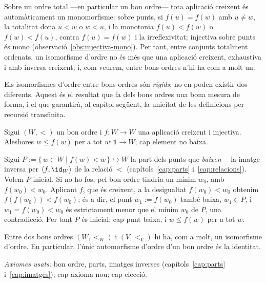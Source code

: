\begin{observacio}\label{obs:creixent-injectiva}
Sobre un ordre total ---en particular un bon ordre--- tota aplicació
creixent és automàticament un monomorfisme: sobre punts, si \(f(u)=f(w)\)
amb \(u\neq w\), la totalitat dona \(u<w\) o \(w<u\), i la monotonia
\(f(u)<f(w)\) o \(f(w)<f(u)\), contra \(f(u)=f(w)\) i la irreflexivitat;
injectiva sobre punts és mono (observació~\ref{obs:injectiva-mono}). Per tant, entre
conjunts totalment ordenats, un isomorfisme d'ordre no és més que una
aplicació creixent, exhaustiva i amb inversa creixent; i, com veurem, entre
bons ordres n'hi ha com a molt un.
\end{observacio}

Els isomorfismes d'ordre entre bons ordres són \emph{rígids}: no en poden
existir dos diferents. Aquest és el resultat que fa dels bons ordres una
bona mesura de forma, i el que garantirà, al capítol següent, la unicitat de
les definicions per recursió transfinita.

\begin{lema}\label{lema:rigidesa}
Sigui \((W,<)\) un bon ordre i \(f\colon W\to W\) una aplicació creixent i
injectiva. Aleshores \(w\le f(w)\) per a tot \(w\colon\mathbf1\to W\); cap
element no baixa.
\end{lema}

\begin{prova}
Sigui \(P:=\{\,w\in W\mid f(w)<w\,\}\hookrightarrow W\) la part dels punts
que \emph{baixen} ---la imatge inversa per \(\langle f,\id_W\rangle\) de la
relació \({<}\) (capítols~\ref{cap:parts} i~\ref{cap:relacions}). Volem
\(P\) inicial. Si no ho fos, pel bon ordre tindria un mínim \(w_0\), amb
\(f(w_0)<w_0\). Aplicant \(f\), que és creixent, a la desigualtat
\(f(w_0)<w_0\) obtenim \(f(f(w_0))<f(w_0)\); és a dir, el punt
\(w_1:=f(w_0)\) també baixa, \(w_1\in P\), i \(w_1=f(w_0)<w_0\) és
estrictament menor que el mínim \(w_0\) de \(P\), una contradicció. Per tant
\(P\) és inicial: cap punt baixa, i \(w\le f(w)\) per a tot \(w\).
\end{prova}

\begin{teorema}\label{teo:unicitat-iso}
Entre dos bons ordres \((W,<_W)\) i \((V,<_V)\) hi ha, com a molt, un
isomorfisme d'ordre. En particular, l'únic automorfisme d'ordre d'un bon
ordre és la identitat.\par
\emph{Axiomes usats:} bon ordre, parts, imatges inverses
(capítols~\ref{cap:parts} i~\ref{cap:imatges}); cap axioma nou; cap elecció.
\end{teorema}

